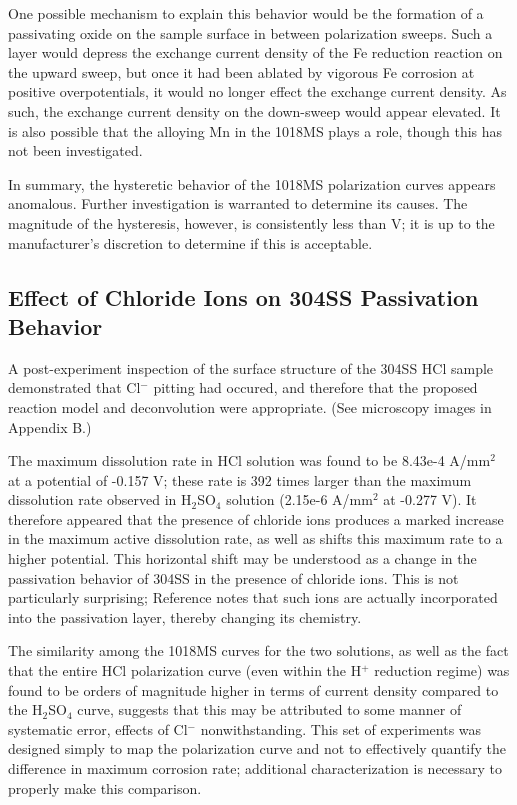 One possible mechanism to explain this behavior would be the formation of a passivating oxide on the sample surface in between polarization sweeps.  Such a layer would depress the exchange current density of the Fe reduction reaction on the upward sweep, but once it had been ablated by vigorous Fe corrosion at positive overpotentials, it would no longer effect the exchange current density.  As such, the exchange current density on the down-sweep would appear elevated.  It is also possible that the alloying Mn in the 1018MS plays a role, though this has not been investigated.

In summary, the hysteretic behavior of the 1018MS polarization curves appears anomalous.  Further investigation is warranted to determine its causes.  The magnitude of the hysteresis, however, is consistently less than  V; it is up to the manufacturer's discretion to determine if this is acceptable.

\subsection{Effect of Chloride Ions on 304SS Passivation Behavior}

A post-experiment inspection of the surface structure of the 304SS HCl sample demonstrated that Cl$^-$ pitting had occured, and therefore that the proposed reaction model and deconvolution were appropriate.  (See microscopy images in Appendix B.)

The maximum dissolution rate in HCl solution was found to be 8.43e-4 A/mm$^2$ at a potential of -0.157 V; these rate is 392 times larger than the maximum dissolution rate observed in H$_2$SO$_4$ solution (2.15e-6 A/mm$^2$ at -0.277 V).  It therefore appeared that the presence of chloride ions produces a marked increase in the maximum active dissolution rate, as well as shifts this maximum rate to a higher potential.  This horizontal shift may be understood as a change in the passivation behavior of 304SS in the presence of chloride ions.  This is not particularly surprising; Reference \cite{cllayer} notes that such ions are actually incorporated into the passivation layer, thereby changing its chemistry.

The similarity among the 1018MS curves for the two solutions, as well as the fact that the entire HCl polarization curve (even within the H$^+$ reduction regime) was found to be  orders of magnitude higher in terms of current density compared to the H$_2$SO$_4$ curve, suggests that this may be attributed to some manner of systematic error, effects of Cl$^-$ nonwithstanding.  This set of experiments was designed simply to map the polarization curve and not to effectively quantify the difference in maximum corrosion rate; additional characterization is necessary to properly make this comparison.

